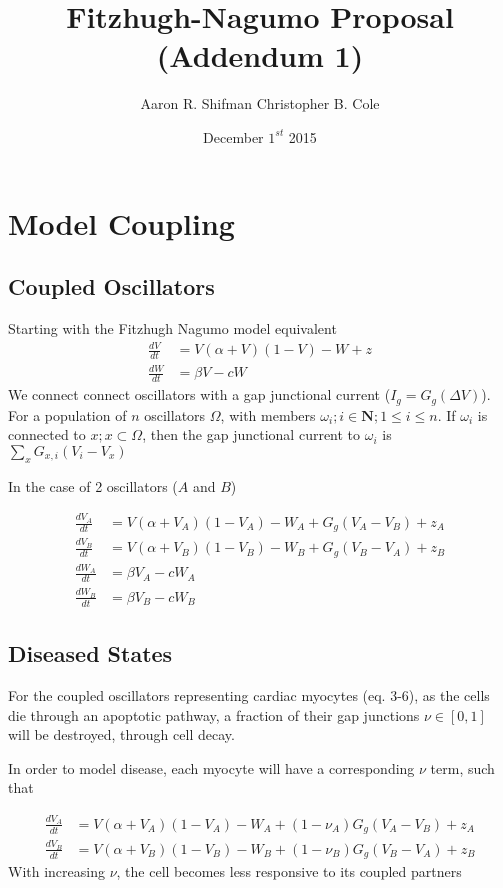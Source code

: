 \documentclass[11pt]{article}
\title{Fitzhugh-Nagumo Proposal (Addendum 1)}
\author{Aaron R. Shifman Christopher B. Cole}
\date{December $1^{st}$ 2015}
\begin{document}
\maketitle
\tableofcontents
\newpage
\section{Model Coupling}
\subsection{Coupled Oscillators}
Starting with the Fitzhugh Nagumo model equivalent
\begin{align}
\frac{dV}{dt} &= V(\alpha +V)(1-V) -W +z\\
\frac{dW}{dt} &= \beta V - cW
\end{align}
We connect connect oscillators with a gap junctional current ($I_g = G_g(\Delta V)$). For a population of $n$ oscillators $\Omega$, with members $\omega_i; i\in \textbf{N}; 1\leq i\leq n$. If $\omega_i$ is connected to $x; x\subset\Omega$, then the gap junctional current to $\omega_i$ is $\sum_{x} G_{x,i}(V_i-V_x)$

In the case of 2 oscillators ($A$ and $B$)

\begin{align}
\frac{dV_A}{dt} &= V(\alpha +V_A)(1-V_A) -W_A + G_g(V_A-V_B) + z_A\\
\frac{dV_B}{dt} &= V(\alpha +V_B)(1-V_B) -W_B + G_g(V_B-V_A) +z_B\\
\frac{dW_A}{dt} &= \beta V_A - cW_A\\
\frac{dW_B}{dt} &= \beta V_B - cW_B
\end{align}

\subsection{Diseased States}
For the coupled oscillators representing cardiac myocytes (eq. 3-6), as the cells die through an apoptotic pathway, a fraction of their gap junctions $\nu \in [0,1]$ will be destroyed, through cell decay.

In order to model disease, each myocyte will have a corresponding $\nu$ term, such that

\begin{align}
\frac{dV_A}{dt} &= V(\alpha +V_A)(1-V_A) -W_A + (1-\nu_A) G_g(V_A-V_B) + z_A\\
\frac{dV_B}{dt} &= V(\alpha +V_B)(1-V_B) -W_B + (1-\nu_B) G_g(V_B-V_A) +z_B
\end{align}
With increasing $\nu$, the cell becomes less responsive to its coupled partners
\end{document}
